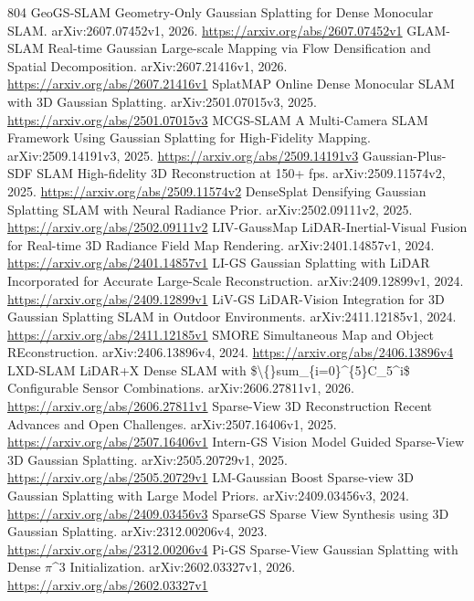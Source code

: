 \documentclass[11pt]{article}
\begin{document}
\begin{thebibliography}{804}
 GeoGS-SLAM Geometry-Only Gaussian Splatting for Dense Monocular SLAM. arXiv:2607.07452v1, 2026. \url{https://arxiv.org/abs/2607.07452v1}
 GLAM-SLAM Real-time Gaussian Large-scale Mapping via Flow Densification and Spatial Decomposition. arXiv:2607.21416v1, 2026. \url{https://arxiv.org/abs/2607.21416v1}
 SplatMAP Online Dense Monocular SLAM with 3D Gaussian Splatting. arXiv:2501.07015v3, 2025. \url{https://arxiv.org/abs/2501.07015v3}
 MCGS-SLAM A Multi-Camera SLAM Framework Using Gaussian Splatting for High-Fidelity Mapping. arXiv:2509.14191v3, 2025. \url{https://arxiv.org/abs/2509.14191v3}
 Gaussian-Plus-SDF SLAM High-fidelity 3D Reconstruction at 150+ fps. arXiv:2509.11574v2, 2025. \url{https://arxiv.org/abs/2509.11574v2}
 DenseSplat Densifying Gaussian Splatting SLAM with Neural Radiance Prior. arXiv:2502.09111v2, 2025. \url{https://arxiv.org/abs/2502.09111v2}
 LIV-GaussMap LiDAR-Inertial-Visual Fusion for Real-time 3D Radiance Field Map Rendering. arXiv:2401.14857v1, 2024. \url{https://arxiv.org/abs/2401.14857v1}
 LI-GS Gaussian Splatting with LiDAR Incorporated for Accurate Large-Scale Reconstruction. arXiv:2409.12899v1, 2024. \url{https://arxiv.org/abs/2409.12899v1}
 LiV-GS LiDAR-Vision Integration for 3D Gaussian Splatting SLAM in Outdoor Environments. arXiv:2411.12185v1, 2024. \url{https://arxiv.org/abs/2411.12185v1}
 SMORE Simultaneous Map and Object REconstruction. arXiv:2406.13896v4, 2024. \url{https://arxiv.org/abs/2406.13896v4}
 LXD-SLAM LiDAR+X Dense SLAM with \$\textbackslash\{\}sum\_\{i=0\}\textasciicircum{}\{5\}C\_5\textasciicircum{}i\$ Configurable Sensor Combinations. arXiv:2606.27811v1, 2026. \url{https://arxiv.org/abs/2606.27811v1}
 Sparse-View 3D Reconstruction Recent Advances and Open Challenges. arXiv:2507.16406v1, 2025. \url{https://arxiv.org/abs/2507.16406v1}
 Intern-GS Vision Model Guided Sparse-View 3D Gaussian Splatting. arXiv:2505.20729v1, 2025. \url{https://arxiv.org/abs/2505.20729v1}
 LM-Gaussian Boost Sparse-view 3D Gaussian Splatting with Large Model Priors. arXiv:2409.03456v3, 2024. \url{https://arxiv.org/abs/2409.03456v3}
 SparseGS Sparse View Synthesis using 3D Gaussian Splatting. arXiv:2312.00206v4, 2023. \url{https://arxiv.org/abs/2312.00206v4}
 Pi-GS Sparse-View Gaussian Splatting with Dense $\pi$\textasciicircum{}3 Initialization. arXiv:2602.03327v1, 2026. \url{https://arxiv.org/abs/2602.03327v1}

\end{thebibliography}
\end{document}
